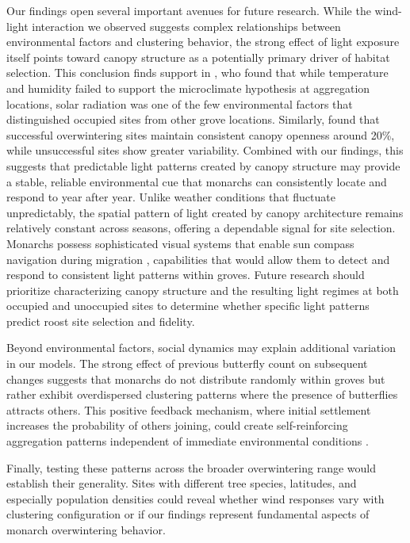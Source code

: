 Our findings open several important avenues for future research. While the wind-light interaction we observed suggests complex relationships between environmental factors and clustering behavior, the strong effect of light exposure itself points toward canopy structure as a potentially primary driver of habitat selection. This conclusion finds support in \textcite{sanieeHierarchyScaleInfluence2022}, who found that while temperature and humidity failed to support the microclimate hypothesis at aggregation locations, solar radiation was one of the few environmental factors that distinguished occupied sites from other grove locations. Similarly, \textcite{weissForestCanopyStructure1991} found that successful overwintering sites maintain consistent canopy openness around 20\%, while unsuccessful sites show greater variability. Combined with our findings, this suggests that predictable light patterns created by canopy structure may provide a stable, reliable environmental cue that monarchs can consistently locate and respond to year after year. Unlike weather conditions that fluctuate unpredictably, the spatial pattern of light created by canopy architecture remains relatively constant across seasons, offering a dependable signal for site selection. Monarchs possess sophisticated visual systems that enable sun compass navigation during migration \parencite{nguyenSunCompassNeurons2021,mouritsenVirtualMigrationTethered2002}, capabilities that would allow them to detect and respond to consistent light patterns within groves. Future research should prioritize characterizing canopy structure and the resulting light regimes at both occupied and unoccupied sites to determine whether specific light patterns predict roost site selection and fidelity.

Beyond environmental factors, social dynamics may explain additional variation in our models. The strong effect of previous butterfly count on subsequent changes suggests that monarchs do not distribute randomly within groves but rather exhibit overdispersed clustering patterns where the presence of butterflies attracts others. This positive feedback mechanism, where initial settlement increases the probability of others joining, could create self-reinforcing aggregation patterns independent of immediate environmental conditions \parencite{berdahlEmergentSensingComplex2013}.

Finally, testing these patterns across the broader overwintering range would establish their generality. Sites with different tree species, latitudes, and especially population densities could reveal whether wind responses vary with clustering configuration or if our findings represent fundamental aspects of monarch overwintering behavior.

